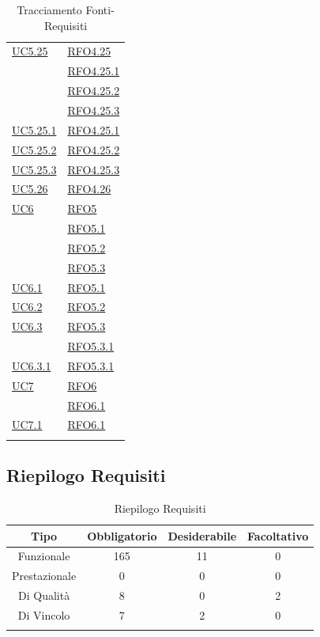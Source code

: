 \begin{longtable}{|>{\centering}m{5cm}|m{5cm}<{\centering}|}
\hyperref[UC5.25]{UC5.25} & \hyperlink{RFO4.25}{RFO4.25}\\
& \hyperlink{RFO4.25.1}{RFO4.25.1}\\
& \hyperlink{RFO4.25.2}{RFO4.25.2}\\
& \hyperlink{RFO4.25.3}{RFO4.25.3}\\ \hline
\hyperref[UC5.25.1]{UC5.25.1} & \hyperlink{RFO4.25.1}{RFO4.25.1}\\\hline
\hyperref[UC5.25.2]{UC5.25.2} & \hyperlink{RFO4.25.2}{RFO4.25.2}\\\hline
\hyperref[UC5.25.3]{UC5.25.3} & \hyperlink{RFO4.25.3}{RFO4.25.3}\\\hline
\hyperref[UC5.26]{UC5.26} & \hyperlink{RFO4.26}{RFO4.26}\\\hline

\hyperref[UC6]{UC6} & \hyperlink{RFO5}{RFO5}\\
 & \hyperlink{RFO5.1}{RFO5.1}\\
 & \hyperlink{RFO5.2}{RFO5.2}\\
 & \hyperlink{RFO5.3}{RFO5.3}\\ \hline
 \hyperref[UC6.1]{UC6.1} & \hyperlink{RFO5.1}{RFO5.1}\\ \hline
 \hyperref[UC6.2]{UC6.2} & \hyperlink{RFO5.2}{RFO5.2}\\ \hline
 \hyperref[UC6.3]{UC6.3} & \hyperlink{RFO5.3}{RFO5.3}\\
 & \hyperlink{RFO5.3.1}{RFO5.3.1}\\ \hline
  \hyperref[UC6.3.1]{UC6.3.1} & \hyperlink{RFO5.3.1}{RFO5.3.1}\\ \hline
\hyperref[UC7]{UC7} & \hyperlink{RFO6}{RFO6}\\
& \hyperlink{RFO6.1}{RFO6.1}\\ \hline
\hyperref[UC7.1]{UC7.1} & \hyperlink{RFO6.1}{RFO6.1}\\ \hline

\caption[Tracciamento Fonti-Requisiti]{Tracciamento Fonti-Requisiti}
\label{tabella:fonti-requi}
\end{longtable}
\clearpage

\subsection{Riepilogo Requisiti}
\normalsize
\begin{longtable}{|c|c|c|c|}
\hline
\textbf{Tipo} & \textbf{Obbligatorio} & \textbf{Desiderabile} & \textbf{Facoltativo}\\
\hline
Funzionale & 165 & 11 & 0\\ \hline
Prestazionale & 0 & 0 & 0\\ \hline
Di Qualità & 8 & 0 & 2\\ \hline
Di Vincolo & 7 & 2 & 0\\ \hline
\caption[Riepilogo Requisiti]{Riepilogo Requisiti}
\label{tabella:riepilogorequi}
\end{longtable}
\clearpage





